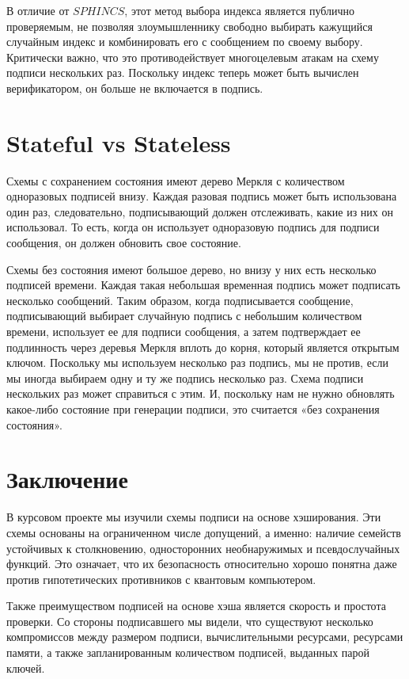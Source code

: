 \documentclass[a4paper, 14pt]{extarticle}
\begin{document}
В отличие от $SPHINCS$, этот метод выбора индекса является публично проверяемым, не позволяя злоумышленнику свободно выбирать кажущийся случайным индекс и комбинировать его с сообщением по своему выбору. Критически важно, что это противодействует многоцелевым атакам на схему подписи нескольких раз. Поскольку индекс теперь может быть вычислен верификатором, он больше не включается в подпись.
\newpage

\section{Stateful vs Stateless}
Схемы с сохранением состояния имеют дерево Меркля с количеством одноразовых подписей внизу. Каждая разовая подпись может быть использована один раз, следовательно, подписывающий должен отслеживать, какие из них он использовал. То есть, когда он использует одноразовую подпись для подписи сообщения, он должен обновить свое состояние.

Схемы без состояния имеют большое дерево, но внизу у них есть несколько подписей времени. Каждая такая небольшая временная подпись может подписать несколько сообщений. Таким образом, когда подписывается сообщение, подписывающий выбирает случайную подпись с небольшим количеством времени, использует ее для подписи сообщения, а затем подтверждает ее подлинность через деревья Меркля вплоть до корня, который является открытым ключом. Поскольку мы используем несколько раз подпись, мы не против, если мы иногда выбираем одну и ту же подпись несколько раз. Схема подписи нескольких раз может справиться с этим. И, поскольку нам не нужно обновлять какое-либо состояние при генерации подписи, это считается «без сохранения состояния».
\newpage

\section{Заключение}
В курсовом проекте мы изучили схемы подписи на основе хэширования. Эти схемы основаны на ограниченном числе допущений, а именно: наличие семейств устойчивых к столкновению, односторонних необнаружимых и псевдослучайных функций. Это означает, что их безопасность относительно хорошо понятна даже против гипотетических противников с квантовым компьютером.

Также преимуществом подписей на основе хэша является скорость и простота проверки. Со стороны подписавшего мы видели, что существуют несколько компромиссов между размером подписи, вычислительными ресурсами, ресурсами памяти, а также запланированным количеством подписей, выданных парой ключей.
\end{document}
